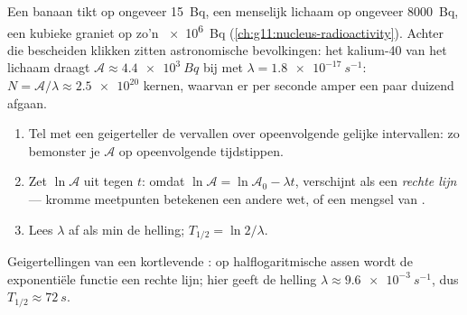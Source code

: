 \begin{example}\label{ex:g12:radioactive-decay:body}
Een banaan tikt op ongeveer \qty{15}{Bq}, een menselijk lichaam op ongeveer
\qty{8000}{Bq}, een kubieke  graniet op zo'n \qty{e6}{Bq}
(\cref{ch:g11:nucleus-radioactivity}). Achter die bescheiden klikken zitten
astronomische bevolkingen: het kalium-40 van het lichaam draagt
$\mathcal A \approx \qty{4.4e3}{Bq}$ bij met
$\lambda = \qty{1.8e-17}{s^{-1}}$: $N = \mathcal A/\lambda \approx
\num{2.5e20}$ kernen, waarvan er per seconde amper een paar duizend afgaan.
\end{example}

\begin{method}\label{met:g12:radioactive-decay:semilog}
\begin{enumerate}
  \item Tel met een geigerteller de vervallen over opeenvolgende gelijke
        intervallen: zo bemonster je $\mathcal A$ op opeenvolgende tijdstippen.
  \item Zet $\ln \mathcal A$ uit tegen $t$: omdat
        $\ln \mathcal A = \ln \mathcal A_0 - \lambda t$, verschijnt
         als een \emph{rechte lijn} --- kromme meetpunten
        betekenen een andere wet, of een mengsel van .
  \item Lees $\lambda$ af als min de helling; $T_{1/2} = \ln 2/\lambda$.
\end{enumerate}
\end{method}

\begin{omfigure}

{\small Geigertellingen van een kortlevende : op halflogaritmische
assen wordt de exponentiële functie een rechte lijn; hier geeft de helling
$\lambda \approx \qty{9.6e-3}{s^{-1}}$, dus $T_{1/2} \approx \qty{72}{s}$.}
\end{omfigure}

